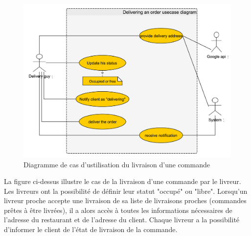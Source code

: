 \documentclass[french, a4paper, 12pt]{report}
\begin{document}
			\newpage
			\begin{figure}[!h]
  				\center
  				\includegraphics[width=15cm]{usecasedeliver.png}
  				\caption{Diagramme de cas d'ustilisation du livraison d'une commande}
  				\label{fig:usecasedeliver}
			\end{figure}
			La figure ci-dessus illustre le cas de la livraison d'une commande par le livreur. Les livreurs ont la possibilité de définir leur statut "occupé" ou "libre". Lorsqu'un livreur proche accepte une livraison de sa liste de livraisons proches (commandes prêtes à être livrées), il a alors accès à toutes les informations nécessaires de l'adresse du restaurant et de l'adresse du client.
Chaque livreur a la possibilité d'informer le client de l'état de livraison de la commande.
			
			
			\newpage
\end{document}
